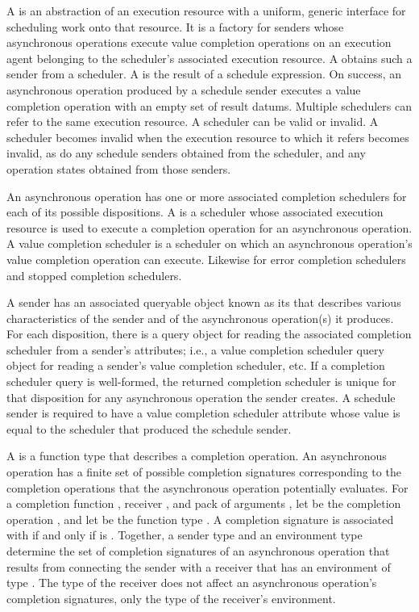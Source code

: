 \pnum
A  is an abstraction of an execution resource
with a uniform, generic interface for scheduling work onto that resource.
It is a factory for senders
whose asynchronous operations execute value completion operations
on an execution agent belonging to
the scheduler's associated execution resource.
A  obtains such a sender from a scheduler.
A  is the result of a schedule expression.
On success, an asynchronous operation produced by a schedule sender executes
a value completion operation with an empty set of result datums.
Multiple schedulers can refer to the same execution resource.
A scheduler can be valid or invalid.
A scheduler becomes invalid when the execution resource to which it refers
becomes invalid,
as do any schedule senders obtained from the scheduler, and
any operation states obtained from those senders.

\pnum
An asynchronous operation has one or more associated completion schedulers
for each of its possible dispositions.
A  is a scheduler
whose associated execution resource is used to execute
a completion operation for an asynchronous operation.
A value completion scheduler is a scheduler
on which an asynchronous operation's value completion operation can execute.
Likewise for error completion schedulers and stopped completion schedulers.

\pnum
A sender has an associated queryable object
known as its 
that describes various characteristics of the sender and
of the asynchronous operation(s) it produces.
For each disposition,
there is a query object for reading the associated completion scheduler
from a sender's attributes;
i.e., a value completion scheduler query object
for reading a sender's value completion scheduler, etc.
If a completion scheduler query is well-formed,
the returned completion scheduler is unique
for that disposition for any asynchronous operation the sender creates.
A schedule sender is required to have a value completion scheduler attribute
whose value is equal to the scheduler that produced the schedule sender.

\pnum
A  is a function type
that describes a completion operation.
An asynchronous operation has a finite set of possible completion signatures
corresponding to the completion operations
that the asynchronous operation potentially evaluates.
For a completion function ,
receiver , and
pack of arguments ,
let  be the completion operation , and
let  be
the function type .
A completion signature  is associated with 
if and only if
 is .
Together, a sender type and an environment type  determine
the set of completion signatures of an asynchronous operation
that results from connecting the sender with a receiver
that has an environment of type .
The type of the receiver does not affect
an asynchronous operation's completion signatures,
only the type of the receiver's environment.

